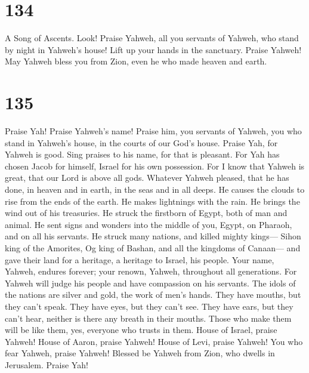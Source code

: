 \hypertarget{section-124}{%
\section{134}\label{section-124}}

A Song of Ascents.  Look! Praise Yahweh, all you servants of
Yahweh, who stand by night in Yahweh's house!  Lift up your
hands in the sanctuary. Praise Yahweh!  May Yahweh bless you
from Zion, even he who made heaven and earth.

\hypertarget{section-125}{%
\section{135}\label{section-125}}

 Praise Yah! Praise Yahweh's name! Praise him, you servants
of Yahweh,  you who stand in Yahweh's house, in the courts
of our God's house.  Praise Yah, for Yahweh is good. Sing
praises to his name, for that is pleasant.  For Yah has
chosen Jacob for himself, Israel for his own possession. 
For I know that Yahweh is great, that our Lord is above all gods.
 Whatever Yahweh pleased, that he has done, in heaven and in
earth, in the seas and in all deeps.  He causes the clouds
to rise from the ends of the earth. He makes lightnings with the rain.
He brings the wind out of his treasuries.  He struck the
firstborn of Egypt, both of man and animal.  He sent signs
and wonders into the middle of you, Egypt, on Pharaoh, and on all his
servants.  He struck many nations, and killed mighty
kings---  Sihon king of the Amorites, Og king of Bashan,
and all the kingdoms of Canaan---  and gave their land for
a heritage, a heritage to Israel, his people.  Your name,
Yahweh, endures forever; your renown, Yahweh, throughout all
generations.  For Yahweh will judge his people and have
compassion on his servants.  The idols of the nations are
silver and gold, the work of men's hands.  They have
mouths, but they can't speak. They have eyes, but they can't see.
 They have ears, but they can't hear, neither is there any
breath in their mouths.  Those who make them will be like
them, yes, everyone who trusts in them.  House of Israel,
praise Yahweh! House of Aaron, praise Yahweh!  House of
Levi, praise Yahweh! You who fear Yahweh, praise Yahweh! 
Blessed be Yahweh from Zion, who dwells in Jerusalem. Praise Yah!

